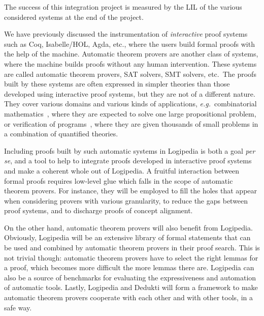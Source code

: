 The success of this integration project is measured by the LIL of the various
considered systems at the end of the project.


We have previously discussed the instrumentation of \emph{interactive}
proof systems such as Coq, Isabelle/HOL, Agda, etc.,
where the users build formal proofs with the help of the
machine. Automatic theorem provers are another class of systems, where
the machine builds proofs without any human intervention.
These systems are called automatic theorem provers, SAT solvers, SMT
solvers, etc.\ The proofs
built by these systems are often expressed in simpler theories than
those developed using interactive proof systems, but they are not of a different
nature.  They cover various domains and various kinds of applications,
{\em e.g.}\ combinatorial
mathematics~\cite{DBLP:journals/ai/KonevL15,DBLP:conf/sat/HeuleKM16},
where they are expected to solve one large propositional problem, or
verification of
programs~\cite{DBLP:conf/esop/FilliatreP13,DBLP:journals/pacmpl/ProtzenkoZRRWBD17},
where they are given thousands of small problems in a combination of
quantified theories.

Including proofs built by such automatic systems in Logipedia
is both a goal {\em per se}, and a tool to help to
integrate proofs developed in interactive proof systems and make a coherent whole out
of Logipedia. A fruitful interaction between formal proofs requires
low-level glue which falls in the scope of automatic theorem provers.
For instance, they will be employed to fill the holes that appear when
considering provers with various granularity, to reduce the gaps
between proof systems, and to discharge proofs of concept alignment.

On the other hand, automatic theorem provers will also benefit from
Logipedia. Obviously, Logipedia will be an extensive library of formal
statements that can be used and combined by automatic theorem provers in their
proof search. This is not trivial though: automatic theorem provers have to
select the right lemmas for a proof, which becomes more difficult the more
lemmas there are.  Logipedia can also be a source of benchmarks for evaluating the
expressiveness and automation of automatic tools.  Lastly, Logipedia and Dedukti
will form a framework to make automatic theorem provers cooperate with each
other and with other tools, in a safe way.

